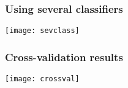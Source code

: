 %

\begin{frame}[fragile]\frametitle{Using several classifiers}
\begin{center}
\texttt{[image: sevclass]}
\end{center}
\end{frame}

\begin{frame}[fragile]\frametitle{Cross-validation results}
\begin{center}
\texttt{[image: crossval]}
\end{center}
\end{frame}





